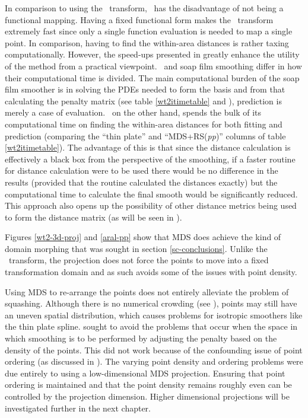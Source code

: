 In comparison to using the \sch\ transform, \mdsap\ has the disadvantage of not being a functional mapping. Having a fixed functional form makes the \sch\ transform extremely fast since only a single function evaluation is needed to map a single point. In comparison, having to find the within-area distances is rather taxing computationally. However, the speed-ups presented in  greatly enhance the utility of the method from a practical viewpoint. \mdsap\ and soap film smoothing differ in how their computational time is divided. The main computational burden of the soap film smoother is in solving the PDEs needed to form the basis and from that calculating the penalty matrix (see table \ref{wt2itimetable} and ), prediction is merely a case of evaluation. \mdsap\ on the other hand, spends the bulk of its computational time on finding the within-area distances for both fitting and prediction (comparing the ``thin plate'' and ``MDS+RS(\textit{pp})'' columns of table \ref{wt2itimetable}). The advantage of this is that since the distance calculation is effectively a black box from the perspective of the smoothing, if a faster routine for distance calculation were to be used there would be no difference in the results (provided that the routine calculated the distances exactly) but the computational time to calculate the final smooth would be significantly reduced. This approach also opens up the possibility of other distance metrics being used to form the distance matrix (as will be seen in ).

Figures \ref{wt2-3d-proj} and \ref{aral-pp} show that MDS does achieve the kind of domain morphing that was sought in section \ref{sc-conclusions}. Unlike the \sch\ transform, the projection does not force the points to move into a fixed transformation domain and as such avoids some of the issues with point density. 

Using MDS to re-arrange the points does not entirely alleviate the problem of squashing. Although there is no numerical crowding (see ), points may still have an uneven spatial distribution, which causes problems for isotropic smoothers like the thin plate spline.  sought to avoid the problems that occur when the space in which smoothing is to be performed by adjusting the penalty based on the density of the points. This did not work because of the confounding issue of point ordering (as discussed in ). The varying point density and ordering problems were due entirely to using a low-dimensional MDS projection. Ensuring that point ordering is maintained and that the point density remains roughly even can be controlled by the projection dimension. Higher dimensional projections will be investigated further in the next chapter.

